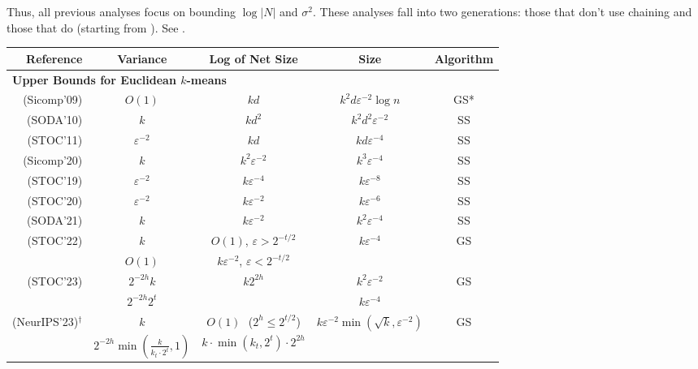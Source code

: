 \documentclass[11pt]{article}
\theoremstyle{restate}
\theoremstyle{definition}
\newcommand{\eps}{\ensuremath{\varepsilon}}
\begin{document}
Thus, all previous analyses focus on bounding $\log |N|$ and $\sigma^2$.
These analyses fall into two generations: those that don't use chaining and those that do (starting from \cite{CGSS22}).
See .



\begin{table}[ht!]
\begin{center}
\begin{tabular}{r|c|c|c|c}
Reference & Variance & Log of Net Size & Size &Algorithm
\\
\hline
\hline
\multicolumn{4}{l}{{\bf Upper Bounds for Euclidean $k$-means}}\\
\hline
\hline
\multirow{1}{*}{\cite{Chen09} (Sicomp'09)}& \multirow{1}{*}{$O(1) $} & \multirow{1}{*}{$kd $} & \multirow{1}{*}{$k^2d \varepsilon^{-2}\log n$} & GS* 
\\\hline
\cite{LS10} (SODA'10) & $k$ & $kd^2$ & $k^2d^2 \varepsilon^{-2}$ & SS
\\\hline
\cite{FL11} (STOC'11)& $\eps^{-2}$ & $kd$ & $kd \varepsilon^{-4}$ & SS
\\\hline
\cite{FeldmanSS20} (Sicomp'20)& $k$ & $k^2\varepsilon^{-2}$& $k^3 \varepsilon^{-4}$  & SS 
\\\hline
\cite{BecchettiBC0S19} (STOC'19) & $\eps^{-2}$ & $k\varepsilon^{-4}$ & $k \varepsilon^{-8}$ & SS 
\\
\hline
\cite{huang2020coresets} (STOC'20)&  $\eps^{-2}$ & $k\varepsilon^{-2}$ & $k \varepsilon^{-6}$ & SS
\\
\hline
\cite{BravermanJKW21} (SODA'21)& $k$ & $k\varepsilon^{-2}$ & $k^2 \varepsilon^{-4}$ & SS
\\
\hline
\multirow{2}{*}{\cite{CSS21} (STOC'22)} & $k$ & $O(1)$, $\varepsilon>2^{-t/2}$  &  \multirow{2}{*}{$k \varepsilon^{-4}$} & \multirow{2}{*}{GS}\\
& $O(1)$ & $k \varepsilon^{-2}$, $\varepsilon < 2^{-t/2}$ & & 
\\
\hline
\multirow{2}{*}{\cite{CGSS22} (STOC'23)} & $2^{-2h}k$ & \multirow{2}{*}{$k 2^{2h}$}  & \multirow{1}{*}{$k^2 \varepsilon^{-2}$}  & \multirow{2}{*}{GS}\\
& $2^{-2h}2^{t}$ & & \multirow{1}{*}{$k \varepsilon^{-4}$}  &\\
\hline
\multirow{3}{*}{\cite{Cohen-AddadLSSS22} (NeurIPS'23)$^\dagger$}  & $k$ & $O(1)$\,\, {\small ($2^h \leq 2^{t/2}$)}  & \multirow{3}{*}{$k \varepsilon^{-2}\min(\sqrt{k},\varepsilon^{-2}) $} & \multirow{2}{*}{GS}  \\
& \multirow{1}{*}{$ 2^{-2h}\min(\frac{k}{k_t\cdot 2^t},1)$} & $k\cdot \min(k_t,2^t)\cdot 2^{2h}$ &   & 

\end{tabular}
\end{center}
\end{table}
\end{document}
